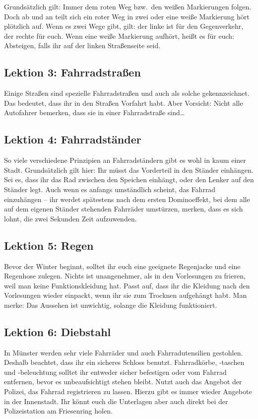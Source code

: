 \begin{multicols}{2}
Grundsätzlich gilt: Immer dem roten Weg bzw.\ den weißen Markierungen folgen. Doch ab und an teilt sich ein roter Weg in zwei oder eine weiße Markierung hört plötzlich auf. Wenn es zwei Wege gibt, gilt: der linke ist für den Gegenverkehr, der rechte für euch. Wenn eine weiße Markierung aufhört, heißt es für euch: Absteigen, falls ihr auf der linken Straßenseite seid.

\subsection*{Lektion 3: Fahrradstraßen}
Einige Straßen sind spezielle Fahrradstraßen und auch als solche gekennzeichnet. Das bedeutet, dass ihr in den Straßen Vorfahrt habt. Aber Vorsicht: Nicht alle Autofahrer bemerken, dass sie in einer Fahrradstraße sind\dots

\subsection*{Lektion 4: Fahrradständer}
So viele verschiedene Prinzipien an Fahrradständern gibt es wohl in kaum einer Stadt. Grundsätzlich gilt hier: Ihr müsst das Vorderteil in den Ständer einhängen. Sei es, dass ihr das Rad zwischen den Speichen einhängt, oder den Lenker auf den Ständer legt. Auch wenn es anfangs umständlich scheint, das Fahrrad einzuhängen -- ihr werdet spätestens nach dem ersten Dominoeffekt, bei dem alle auf dem eigenen Ständer stehenden Fahrräder umstürzen, merken, dass es sich lohnt, die zwei Sekunden Zeit aufzuwenden.

\subsection*{Lektion 5: Regen}
Bevor der Winter beginnt, solltet ihr euch eine geeignete Regenjacke und eine Regenhose zulegen. Nichts ist unangenehmer, als in den Vorlesungen zu frieren, weil man keine Funktionskleidung hat. Passt auf, dass ihr die Kleidung nach den Vorlesungen wieder einpackt, wenn ihr sie zum Trocknen aufgehängt habt. Man merke: Das Aussehen ist unwichtig, solange die Kleidung funktioniert.

\subsection*{Lektion 6: Diebstahl}
In Münster werden sehr viele Fahrräder und auch Fahrradutensilien gestohlen. Deshalb beachtet, dass ihr ein sicheres Schloss benutzt. Fahrradkörbe, -taschen und -beleuchtung solltet ihr entweder sicher befestigen oder vom Fahrrad entfernen, bevor es unbeaufsichtigt stehen bleibt. Nutzt auch das Angebot der Polizei, das Fahrrad registrieren zu lassen. Hierzu gibt es immer wieder Angebote in der Innenstadt. Ihr könnt euch die Unterlagen aber auch direkt bei der Polizeistation am Friesenring holen.


\end{multicols}

